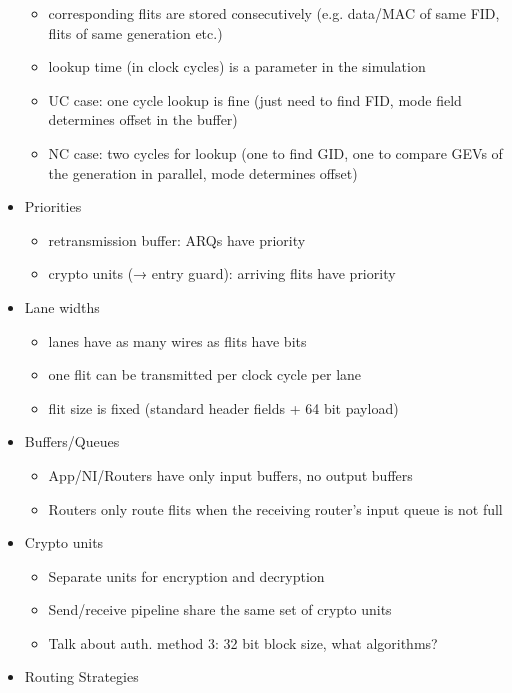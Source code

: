 \begin{itemize}
\begin{itemize}
            \item corresponding flits are stored consecutively (e.g. data/MAC of same FID, flits of same generation etc.)
            \item lookup time (in clock cycles) is a parameter in the simulation
            \item UC case: one cycle lookup is fine (just need to find FID, mode field determines offset in the buffer)
            \item NC case: two cycles for lookup (one to find GID, one to compare GEVs of the generation in parallel, mode determines offset)
        \end{itemize}
    \item Priorities
        \begin{itemize}
            \item retransmission buffer: ARQs have priority
            \item crypto units (→ entry guard): arriving flits have priority
        \end{itemize}
    \item Lane widths
        \begin{itemize}
            \item lanes have as many wires as flits have bits
            \item one flit can be transmitted per clock cycle per lane
            \item flit size is fixed (standard header fields + 64 bit payload)
        \end{itemize}
    \item Buffers/Queues
        \begin{itemize}
            \item App/NI/Routers have only input buffers, no output buffers
            \item Routers only route flits when the receiving router's input queue is not full
        \end{itemize}
    \item Crypto units
        \begin{itemize}
            \item Separate units for encryption and decryption
            \item Send/receive pipeline share the same set of crypto units
            \item Talk about auth. method 3: 32 bit block size, what algorithms?
        \end{itemize}
    \item Routing Strategies

\end{itemize}
